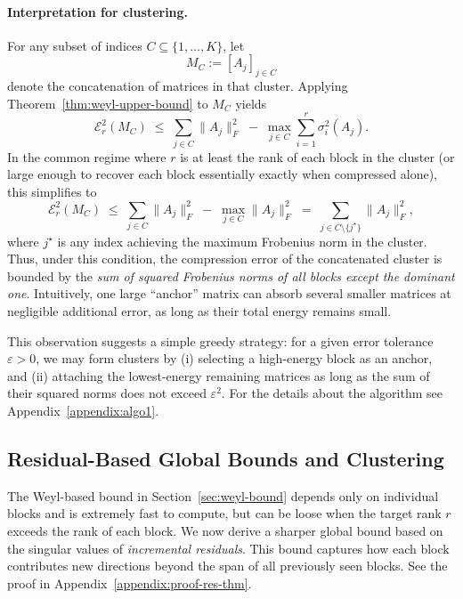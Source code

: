 \documentclass[10pt]{article} %
\begin{document}
\paragraph{Interpretation for clustering.}
For any subset of indices $C \subseteq \{1,\dots,K\}$, let
\[
  M_C := [A_j]_{j\in C}
\]
denote the concatenation of matrices in that cluster. Applying
Theorem~\ref{thm:weyl-upper-bound} to $M_C$ yields
\[
  \mathcal{E}_r^2(M_C)
  \;\le\;
  \sum_{j\in C} \|A_j\|_F^2
  \;-\;
  \max_{j\in C} \sum_{i=1}^r \sigma_i^2(A_j).
\]
In the common regime where $r$ is at least the rank of each block in the
cluster (or large enough to recover each block essentially exactly when
compressed alone), this simplifies to
\[
  \mathcal{E}_r^2(M_C)
  \;\le\;
  \sum_{j\in C} \|A_j\|_F^2
  \;-\;
  \max_{j\in C} \|A_j\|_F^2
  \;=\;
  \sum_{j\in C \setminus \{j^\star\}} \|A_j\|_F^2,
\]
where $j^\star$ is any index achieving the maximum Frobenius norm in the
cluster. Thus, under this condition, the compression error of the concatenated
cluster is bounded by the \emph{sum of squared Frobenius norms of all blocks
except the dominant one}. Intuitively, one large ``anchor'' matrix can absorb
several smaller matrices at negligible additional error, as long as their total
energy remains small.

This observation suggests a simple greedy strategy: for a given error tolerance
$\varepsilon > 0$, we may form clusters by (i) selecting a high-energy block as
an anchor, and (ii) attaching the lowest-energy remaining matrices as long as
the sum of their squared norms does not exceed $\varepsilon^2$. For the details about the algorithm see Appendix~\ref{appendix:algo1}.

\subsection{Residual-Based Global Bounds and Clustering}
\label{sec:residual-bounds}

The Weyl-based bound in Section~\ref{sec:weyl-bound} depends only on individual
blocks and is extremely fast to compute, but can be loose when the target rank
$r$ exceeds the rank of each block. We now derive a sharper global bound based
on the singular values of \emph{incremental residuals}. This bound captures how
each block contributes new directions beyond the span of all previously seen
blocks. See the proof in Appendix~\ref{appendix:proof-res-thm}.
\end{document}
